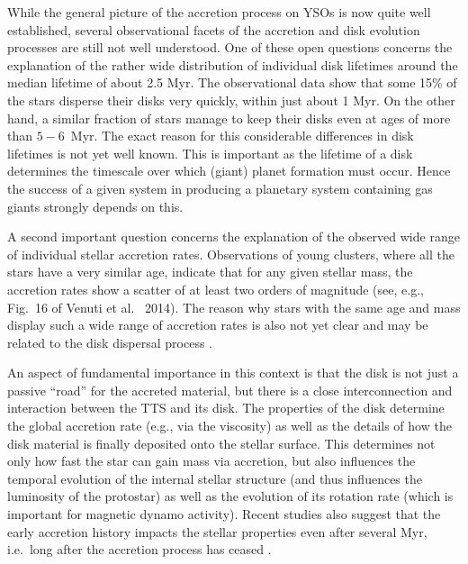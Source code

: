 \documentclass[10pt,fleqn,twoside,a4paper]{article}
\begin{document}
\medskip

While the general picture of the accretion process on YSOs is now quite well established,
several observational facets of the accretion and disk evolution processes
are still not well understood.
%
One of these open questions concerns the explanation of  the rather wide distribution 
of individual disk lifetimes
around the median lifetime of about 2.5 Myr.
The observational data show that some 15\% of the stars disperse their disks very quickly, within
just about 1 Myr.  On the other hand, a similar fraction of stars manage to keep their
disks even at ages of more than $5-6$~Myr. 
The exact reason for this considerable differences 
in disk lifetimes is not yet well known. This is important as the
lifetime of a disk determines the timescale over which (giant) planet
formation must occur. Hence the success of a given system in producing
a planetary system containing gas giants strongly depends on this. 

A second important question concerns the explanation of the observed
wide range of individual stellar accretion rates.
Observations of young clusters, where all the stars have a very similar age,
indicate that for any given stellar mass, the accretion rates show a scatter
of at least two orders of magnitude (see, e.g., Fig.~16 of Venuti et al.~ 2014).
 The reason why stars with the same age and mass display such a wide
range of accretion rates is also not yet clear and may be related to
the disk dispersal process \citep{Owen11,Ercolano14}.



\bigskip


An aspect of fundamental importance in this context is that the disk is not
just a passive ``road'' for the accreted material,
but there is a close interconnection and interaction between
the TTS and its disk.
%
The properties of the disk determine the global accretion rate 
(e.g., via the viscosity) as well 
as the details of how the disk material is
finally deposited onto the stellar surface. This determines
 not only 
how fast the star can gain
mass via accretion, but also influences the temporal evolution of the 
internal stellar structure (and thus influences the luminosity of the protostar)
as well as the evolution of its rotation rate (which is important for 
magnetic dynamo activity). Recent studies also suggest that the
early accretion history impacts the stellar properties even after
several Myr, i.e.~long after the accretion process has ceased \citep[see][]{Baraffe16}.
\end{document}
